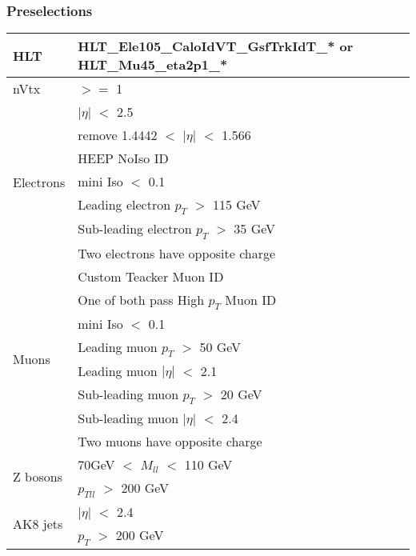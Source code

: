\documentclass[aspectratio=169]{beamer}
\begin{document}
\begin{frame}
  \frametitle{Preselections}
  \justifying
  \begin{tiny}
    \begin{center}
      \begin{tabular}[t]{ | l | l | }
        \hline
        HLT       
        & HLT\_Ele105\_CaloIdVT\_GsfTrkIdT\_* or HLT\_Mu45\_eta2p1\_*  \\
        \hline
        nVtx 
        & $>=$ 1                                         \\
        \hline
        \multirow{7}{*}{Electrons} 
        & $|\eta|$ $<$ 2.5                               \\
        & remove 1.4442 $<$ $|\eta|$ $<$ 1.566           \\
        & HEEP NoIso ID                                  \\
        & mini Iso $<$ 0.1                               \\
        & Leading electron $p_T$ $>$ 115 GeV             \\
        & Sub-leading electron $p_T$ $>$ 35 GeV          \\
        & Two electrons have opposite charge             \\
        \hline
        \multirow{8}{*}{Muons}
        & Custom Teacker Muon ID                         \\ 
        & One of both pass High $p_T$ Muon ID            \\
        & mini Iso $<$ 0.1                               \\
        & Leading muon $p_T$ $>$ 50 GeV                  \\
        & Leading muon $|\eta|$ $<$ 2.1                  \\
        & Sub-leading muon $p_T$ $>$ 20 GeV              \\
        & Sub-leading muon $|\eta|$ $<$ 2.4              \\ 
        & Two muons have opposite charge                 \\
        \hline
        \multirow{2}{*}{Z bosons}
        & 70GeV $<$ $M_{ll}$ $<$ 110 GeV                 \\
        & $p_{Tll}$ $>$ 200 GeV                          \\
        \hline
        \multirow{6}{*}{AK8 jets}
        & $|\eta|$ $<$ 2.4                               \\ 
        & $p_T$ $>$ 200 GeV                              \\

\end{tabular}
\end{center}
\end{tiny}
\end{frame}
\end{document}
